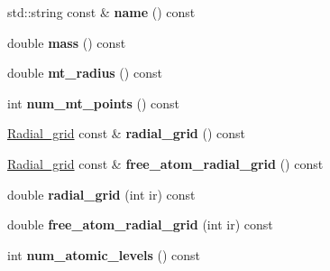 \begin{DoxyCompactItemize}
\item 
\hypertarget{classsirius_1_1_atom__type_a20c9fb8c5fd0e8633006f1a81cb9fdfe}{}std\+::string const \& {\bfseries name} () const \label{classsirius_1_1_atom__type_a20c9fb8c5fd0e8633006f1a81cb9fdfe}

\item 
\hypertarget{classsirius_1_1_atom__type_af5a50024fc9bd702a2e3e43e4b412312}{}double {\bfseries mass} () const \label{classsirius_1_1_atom__type_af5a50024fc9bd702a2e3e43e4b412312}

\item 
\hypertarget{classsirius_1_1_atom__type_a700bfa47246b80574d56c84c68eded51}{}double {\bfseries mt\+\_\+radius} () const \label{classsirius_1_1_atom__type_a700bfa47246b80574d56c84c68eded51}

\item 
\hypertarget{classsirius_1_1_atom__type_a10ca1588cabc7bae64622c012c69a288}{}int {\bfseries num\+\_\+mt\+\_\+points} () const \label{classsirius_1_1_atom__type_a10ca1588cabc7bae64622c012c69a288}

\item 
\hypertarget{classsirius_1_1_atom__type_a782a2f64eed9be12ba97bf0fc91b8b09}{}\hyperlink{classsirius_1_1_radial__grid}{Radial\+\_\+grid} const \& {\bfseries radial\+\_\+grid} () const \label{classsirius_1_1_atom__type_a782a2f64eed9be12ba97bf0fc91b8b09}

\item 
\hypertarget{classsirius_1_1_atom__type_a67375ccb9a6436628ea570707364c99a}{}\hyperlink{classsirius_1_1_radial__grid}{Radial\+\_\+grid} const \& {\bfseries free\+\_\+atom\+\_\+radial\+\_\+grid} () const \label{classsirius_1_1_atom__type_a67375ccb9a6436628ea570707364c99a}

\item 
\hypertarget{classsirius_1_1_atom__type_ac69d4459b8b9d2f1bb1112e04cba5114}{}double {\bfseries radial\+\_\+grid} (int ir) const \label{classsirius_1_1_atom__type_ac69d4459b8b9d2f1bb1112e04cba5114}

\item 
\hypertarget{classsirius_1_1_atom__type_aff5e5a792feb10527213a237e3605d2d}{}double {\bfseries free\+\_\+atom\+\_\+radial\+\_\+grid} (int ir) const \label{classsirius_1_1_atom__type_aff5e5a792feb10527213a237e3605d2d}

\item 
\hypertarget{classsirius_1_1_atom__type_ac5458c71304ec97193556d17b42abb1e}{}int {\bfseries num\+\_\+atomic\+\_\+levels} () const \label{classsirius_1_1_atom__type_ac5458c71304ec97193556d17b42abb1e}


\end{DoxyCompactItemize}
